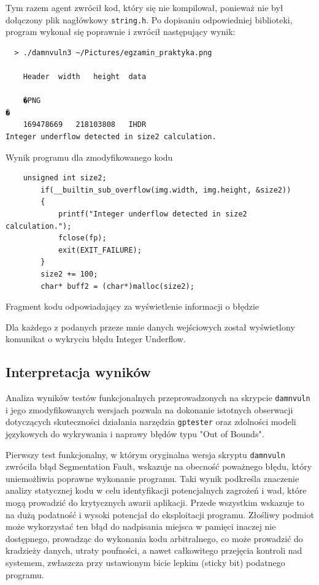 Tym razem agent zwrócił kod, który się nie kompilował, ponieważ nie był dołączony plik nagłówkowy \texttt{string.h}. Po dopisaniu odpowiedniej biblioteki, program wykonał się poprawnie i zwrócił następujący wynik:

\begin{listing}[H]
  \begin{verbatim}
  > ./damnvuln3 ~/Pictures/egzamin_praktyka.png 

	Header	width	height	data	

	�PNG
�
	169478669	218103808	IHDR
Integer underflow detected in size2 calculation.
\end{verbatim}
\caption{Wynik programu dla zmodyfikowanego kodu}
\label{lst:int_underflow}
\end{listing}

\begin{listing}
  \begin{verbatim}
    unsigned int size2;
        if(__builtin_sub_overflow(img.width, img.height, &size2))
        {
            printf("Integer underflow detected in size2 calculation.");
            fclose(fp);
            exit(EXIT_FAILURE);
        }
        size2 += 100;
        char* buff2 = (char*)malloc(size2);
\end{verbatim}
\caption{Fragment kodu odpowiadający za wyświetlenie informacji o błędzie}
\label{lst:code4}
\end{listing}

Dla każdego z podanych przeze mnie danych wejściowych został wyświetlony komunikat o wykryciu błędu Integer Underflow.

\subsection{Interpretacja wyników}
\label{subsec:interpretacja_wynikow}

Analiza wyników testów funkcjonalnych przeprowadzonych na skrypcie \texttt{damnvuln} i jego zmodyfikowanych wersjach pozwala na dokonanie istotnych obserwacji dotyczących skuteczności działania narzędzia \texttt{gptester} oraz zdolności modeli językowych do wykrywania i naprawy błędów typu "Out of Bounds".

Pierwszy test funkcjonalny, w którym oryginalna wersja skryptu \texttt{damnvuln} zwróciła błąd Segmentation Fault, wskazuje na obecność poważnego błędu, który uniemożliwia poprawne wykonanie programu. Taki wynik podkreśla znaczenie analizy statycznej kodu w celu identyfikacji potencjalnych zagrożeń i wad, które mogą prowadzić do krytycznych awarii aplikacji. Przede wszystkim wskazuje to na dużą podatność i wysoki potencjał do eksploitacji programu. Złośliwy podmiot może wykorzystać ten błąd do nadpisania miejsca w pamięci inaczej nie dostępnego, prowadząc do wykonania kodu arbitralnego, co może prowadzić do kradzieży danych, utraty poufności, a nawet całkowitego przejęcia kontroli nad systemem, zwłaszcza przy ustawionym bicie lepkim (sticky bit) podatnego programu. 


